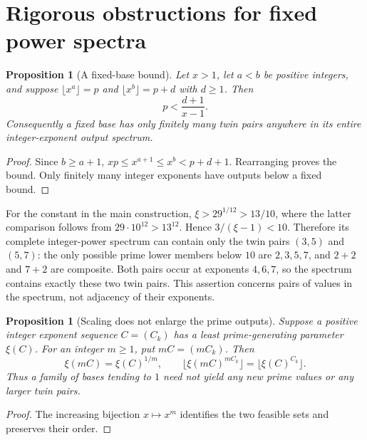 \documentclass[11pt,a4paper]{article}
\newtheorem{proposition}[theorem]{Proposition}
\theoremstyle{definition}
\theoremstyle{remark}
\numberwithin{equation}{section}
\begin{document}
\section{Rigorous obstructions for fixed power spectra}
\label{enc:sp:obstructions}

\begin{proposition}[A fixed-base bound]\label{enc:sp:fixed-base}
Let $x>1$, let $a<b$ be positive integers, and suppose
$\lfloor x^a\rfloor=p$ and $\lfloor x^b\rfloor=p+d$ with $d\ge1$.
Then
\begin{equation}\label{enc:sp:fixed-base-bound}
 p<\frac{d+1}{x-1}.
\end{equation}
Consequently a fixed base has only finitely many twin pairs anywhere in
its entire integer-exponent output spectrum.
\end{proposition}
\begin{proof}
Since $b\ge a+1$,
$xp\le x^{a+1}\le x^b<p+d+1$. Rearranging proves the bound.
Only finitely many integer exponents have outputs below a fixed bound.
\end{proof}

For the constant in the main construction,
$\xi>29^{1/12}>13/10$, where the latter comparison follows from
$29\cdot10^{12}>13^{12}$. Hence $3/(\xi-1)<10$.
Therefore its complete integer-power spectrum can contain only the twin
pairs $(3,5)$ and $(5,7)$: the only possible prime lower members below
$10$ are $2,3,5,7$, and $2+2$ and $7+2$ are composite.
Both pairs occur at exponents $4,6,7$, so the spectrum contains exactly
these two twin pairs. This assertion concerns pairs of values in the
spectrum, not adjacency of their exponents.

\begin{proposition}[Scaling does not enlarge the prime outputs]
\label{enc:sp:scaling}
Suppose a positive integer exponent sequence $C=(C_k)$ has a least
prime-generating parameter $\xi(C)$. For an integer $m\ge1$, put
$mC=(mC_k)$. Then
\[
 \xi(mC)=\xi(C)^{1/m},\qquad
 \lfloor\xi(mC)^{mC_k}\rfloor=\lfloor\xi(C)^{C_k}\rfloor.
\]
Thus a family of bases tending to $1$ need not yield any new prime values
or any larger twin pairs.
\end{proposition}
\begin{proof}
The increasing bijection $x\mapsto x^m$ identifies the two feasible sets
and preserves their order.
\end{proof}
\end{document}
